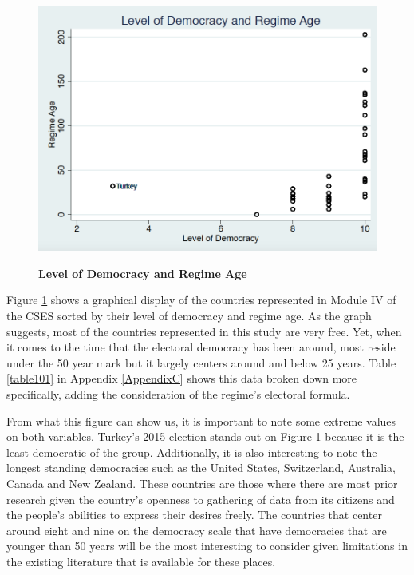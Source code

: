 \documentclass[12pt, titlepage]{article}
\newcommand\tb{\textbf}
\begin{document}
\begin{figure}[ht!]    \centering
	{	 \includegraphics[width=\textwidth]{AgeDemPF}}
	\caption{\tb{Level of Democracy and Regime Age}}\label{figure2}
\end{figure}

Figure \ref{figure2} shows a graphical display of the countries represented in Module IV of the CSES sorted by their level of democracy and regime age. As the graph suggests, most of the countries represented in this study are very free. Yet, when it comes to the time that the electoral democracy has been around, most reside under the 50 year mark but it largely centers around and below 25 years. Table \ref{table101} in Appendix \ref{AppendixC} shows this data broken down more specifically, adding the consideration of the regime's electoral formula. 

From what this figure can show us, it is important to note some extreme values on both variables. Turkey's 2015 election stands out on Figure \ref{figure2} because it is the least democratic of the group. Additionally, it is also interesting to note the longest standing democracies such as the United States, Switzerland, Australia, Canada and New Zealand. These countries are those where there are most prior research given the country's openness to gathering of data from its citizens and the people's abilities to express their desires freely. The countries that center around eight and nine on the democracy scale that have democracies that are younger than 50 years will be the most interesting to consider given limitations in the existing literature that is available for these places.
\end{document}
